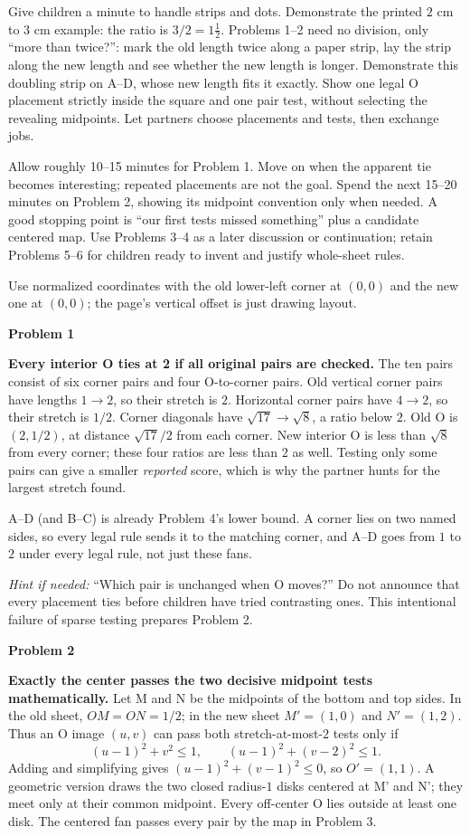 \documentclass[11pt,letterpaper]{article}
\newcommand{\sect}[1]{\par\vspace{5pt}{\large\bfseries #1}\par}
\newcommand{\prob}[1]{\par\vspace{3pt}\textbf{Problem #1}\par}
\begin{document}
\sect{Launch and a feasible first visit}
Give children a minute to handle strips and dots. Demonstrate the printed
$2$ cm to $3$ cm example: the ratio is $3/2=1\frac12$. Problems 1--2 need no
division, only ``more than twice?'': mark the old length twice along a paper strip,
lay the strip along the new length and see whether the new length is longer.
Demonstrate this doubling strip on A--D, whose new length fits it exactly.
Show one legal O placement strictly inside the square and one pair test, without
selecting the revealing midpoints. Let partners choose placements and tests, then exchange jobs.

Allow roughly 10--15 minutes for Problem 1. Move on when the apparent tie becomes
interesting; repeated placements are not the goal. Spend the next 15--20 minutes
on Problem 2, showing its midpoint convention only when needed. A good stopping
point is ``our first tests missed something'' plus a candidate centered map.
Use Problems 3--4 as a later discussion or continuation; retain Problems 5--6
for children ready to invent and justify whole-sheet rules.
\newpage
\sect{Answers and optional hints}
Use normalized coordinates with the old lower-left corner at $(0,0)$ and the new
one at $(0,0)$; the page's vertical offset is just drawing layout.

\prob{1}
\textbf{Every interior O ties at 2 if all original pairs are checked.}
The ten pairs consist of six corner pairs and four O-to-corner pairs.
Old vertical corner pairs have lengths $1\to2$, so their stretch is $2$.
Horizontal corner pairs have $4\to2$, so their stretch is $1/2$.
Corner diagonals have $\sqrt{17}\to\sqrt8$, a ratio below $2$.
Old O is $(2,1/2)$, at distance $\sqrt{17}/2$ from each corner.
New interior O is less than $\sqrt8$ from every corner; these four ratios are
less than $2$ as well. Testing only some pairs can give a smaller \emph{reported}
score, which is why the partner hunts for the largest stretch found.

A--D (and B--C) is already Problem 4's lower bound. A corner lies on two named
sides, so every legal rule sends it to the matching corner, and A--D goes from
$1$ to $2$ under every legal rule, not just these fans.

\textit{Hint if needed:} ``Which pair is unchanged when O moves?''
Do not announce that every placement ties before children have tried contrasting
ones. This intentional failure of sparse testing prepares Problem 2.

\prob{2}
\textbf{Exactly the center passes the two decisive midpoint tests mathematically.}
Let M and N be the midpoints of the bottom and top sides. In the old sheet,
$OM=ON=1/2$; in the new sheet $M'=(1,0)$ and $N'=(1,2)$.
Thus an O image $(u,v)$ can pass both stretch-at-most-$2$ tests only if
\[
 (u-1)^2+v^2\le1,\qquad (u-1)^2+(v-2)^2\le1.
\]
Adding and simplifying gives $(u-1)^2+(v-1)^2\le0$, so $O'=(1,1)$.
A geometric version draws the two closed radius-$1$ disks centered at M' and N';
they meet only at their common midpoint. Every off-center O lies outside at
least one disk. The centered fan passes every pair by the map in Problem 3.
\end{document}
